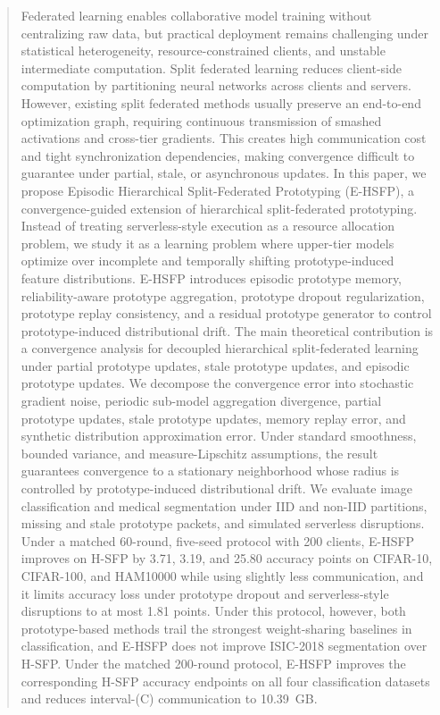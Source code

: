 \begin{abstract}
Federated learning enables collaborative model training without centralizing raw data, but practical deployment remains challenging under statistical heterogeneity, resource-constrained clients, and unstable intermediate computation. Split federated learning reduces client-side computation by partitioning neural networks across clients and servers. However, existing split federated methods usually preserve an end-to-end optimization graph, requiring continuous transmission of smashed activations and cross-tier gradients. This creates high communication cost and tight synchronization dependencies, making convergence difficult to guarantee under partial, stale, or asynchronous updates.
In this paper, we propose Episodic Hierarchical Split-Federated Prototyping (E-HSFP), a convergence-guided extension of hierarchical split-federated prototyping. Instead of treating serverless-style execution as a resource allocation problem, we study it as a learning problem where upper-tier models optimize over incomplete and temporally shifting prototype-induced feature distributions. E-HSFP introduces episodic prototype memory, reliability-aware prototype aggregation, prototype dropout regularization, prototype replay consistency, and a residual prototype generator to control prototype-induced distributional drift.
The main theoretical contribution is a convergence analysis for decoupled hierarchical split-federated learning under partial prototype updates, stale prototype updates, and episodic prototype updates. We decompose the convergence error into stochastic gradient noise, periodic sub-model aggregation divergence, partial prototype updates, stale prototype updates, memory replay error, and synthetic distribution approximation error. Under standard smoothness, bounded variance, and measure-Lipschitz assumptions, the result guarantees convergence to a stationary neighborhood whose radius is controlled by prototype-induced distributional drift. We evaluate image classification and medical segmentation under IID and non-IID partitions, missing and stale prototype packets, and simulated serverless disruptions. Under a matched 60-round, five-seed protocol with 200 clients, E-HSFP improves on H-SFP by 3.71, 3.19, and 25.80 accuracy points on CIFAR-10, CIFAR-100, and HAM10000 while using slightly less communication, and it limits accuracy loss under prototype dropout and serverless-style disruptions to at most 1.81 points. Under this protocol, however, both prototype-based methods trail the strongest weight-sharing baselines in classification, and E-HSFP does not improve ISIC-2018 segmentation over H-SFP. Under the matched 200-round protocol, E-HSFP improves the corresponding H-SFP accuracy endpoints on all four classification datasets and reduces interval-(C) communication to 10.39~GB.
\end{abstract}
